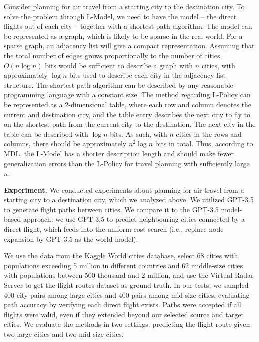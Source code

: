 {

Consider planning for air travel from a starting city to the destination city. To solve the problem through L-Model, we need to have the model -- the direct flights out of each city -- together with a shortest path algorithm. The model can be represented as a graph, which is likely to be sparse in the real world. 
For a sparse graph, an adjacency list will give a compact representation. 
Assuming that the total number of edges grows proportionally to the number of cities, $O(n\log n)$ bits would be sufficient to describe a graph with $n$ cities, with approximately $\log n$ bits used to describe each city in the adjacency list structure. The shortest path algorithm can be described by any reasonable programming language with a constant size. 
The method regarding L-Policy 
can be represented as a 2-dimensional table, where each row and column denotes the current and destination city, and the table entry describes the next city to fly to on the shortest path from the current city to the destination. The next city in the table can be described with $\log n$ bits. As such, with $n$ cities in the rows and columns, there should be approximately $n^2\log n$ bits in total. Thus, according to MDL, the L-Model has a shorter description length and should make fewer generalization errors than the L-Policy for travel planning with sufficiently large $n$. 

\textbf{Experiment.} 
We conducted experiments about planning for air travel from a starting city to a destination city, which we analyzed above. We utilized GPT-3.5 to generate flight paths between cities. We compare it to the GPT-3.5 model-based approach: we use GPT-3.5 to predict neighbouring cities connected by a direct flight, which feeds into the uniform-cost search (i.e., replace node expansion by GPT-3.5 as the world model). 

We use the data from the Kaggle World cities database, select 68 cities with populations exceeding 5 million in different countries and 62 middle-size cities with populations between 500 thousand and 2 million, and use the Virtual Radar Server to get the flight routes dataset as ground truth. In our tests, we sampled 400 city pairs among large cities and 400 pairs among mid-size cities, evaluating path accuracy by verifying each direct flight exists. Paths were accepted if all flights were valid, even if they extended beyond our selected source and target cities. 
We evaluate the methods in two settings: predicting the flight route given two large cities and two mid-size cities.

}
